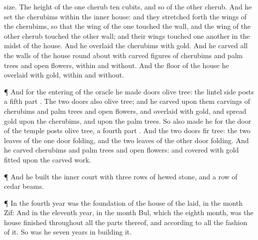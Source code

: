 {size.
The
height of the
one
cherub
{}
ten
cubits, and so
{} of the
other
cherub.
And he
set the
cherubims
within the
inner
house: and they stretched
forth the
wings of the
cherubims, so that the
wing of the
one
touched the
{}
wall, and the
wing of the
other
cherub
touched the
other
wall; and their
wings
touched
one
another in the
midst of the
house.
And he
overlaid the
cherubims with
gold.
And he
carved all the
walls of the
house round
about with
carved
figures of
cherubims and palm
trees and
open
flowers,
within and
without.
And the
floor of the
house he
overlaid with
gold,
within and
without.
\par }{\PP {}¶ And for the
entering of the
oracle he
made
doors
{}
olive
tree: the
lintel
{} side
posts
{} a fifth
part
{}.
The
two
doors also
{}
olive
tree; and he
carved upon them
carvings of
cherubims and palm
trees and
open
flowers, and
overlaid
{} with
gold, and
spread
gold upon the
cherubims, and upon the palm
trees.
So also
made he for the
door of the
temple
posts
{}
olive
tree, a fourth
part
{}.
And the
two
doors
{}
fir
tree: the
two
leaves of the
one
door
{}
folding, and the
two
leaves of the
other
door
{}
folding.
And he
carved
{}
cherubims and palm
trees and
open
flowers: and
covered
{} with
gold
fitted upon the carved
work.
\par }{\PP {}¶ And he
built the
inner
court with
three
rows of hewed
stone, and a
row of
cedar
beams.
\par }{\PP {}¶ In the
fourth
year was the
foundation of the
house of the
{}
laid, in the
month
Zif:
And in the
eleventh
year, in the
month
Bul, which
{} the
eighth
month, was the
house
finished throughout all the
parts thereof, and according to all the
fashion of it. So was he
seven
years in
building it.

}
